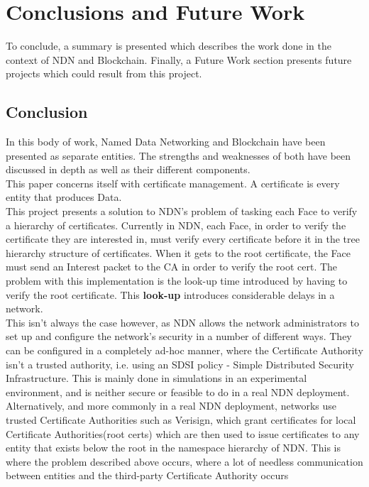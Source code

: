 \chapter{Conclusions and Future Work}
To conclude, a summary is presented which describes the work done in the context of NDN and Blockchain. Finally, a Future Work section presents future projects which could result from this project.\\

\section{Conclusion}
In this body of work, Named Data Networking and Blockchain have been presented as separate entities. The strengths and weaknesses of both have been discussed in depth as well as their different components. \\
This paper concerns itself with certificate management. A certificate is every entity that produces Data.\\
This project presents a solution to NDN's problem of tasking each Face to verify a hierarchy of certificates. Currently in NDN, each Face, in order to verify the certificate they are interested in, must verify every certificate before it in the tree hierarchy structure of certificates. When it gets to the root certificate, the Face must send an Interest packet to the CA in order to verify the root cert. The problem with this implementation is the look-up time introduced by having to verify the root certificate. This \textbf{look-up} introduces considerable delays in a network.\\
This isn't always the case however, as NDN allows the network administrators to set up and configure the network's security in a number of different ways. They can be configured in a completely ad-hoc manner, where the Certificate Authority isn't a trusted authority, i.e. using an SDSI policy - Simple Distributed Security Infrastructure. This is mainly done in simulations in an experimental environment, and is neither secure or feasible to do in a real NDN deployment.\\

Alternatively, and more commonly in a real NDN deployment, networks use trusted Certificate Authorities such as Verisign, which grant certificates for local Certificate Authorities(root certs) which are then used to issue certificates to any entity that exists below the root in the namespace hierarchy of NDN. This is where the problem described above occurs, where a lot of needless communication between entities and the third-party Certificate Authority occurs \\


